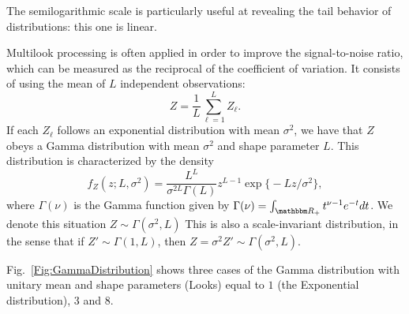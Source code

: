 \documentclass{beamer}
\begin{document}
\begin{frame}[allowframebreaks]

The semilogarithmic scale is particularly useful at revealing the tail behavior of distributions: this one is linear.

Multilook processing is often applied in order to improve the signal-to-noise ratio, which can be measured as the reciprocal of the coefficient of variation.
It consists of using the mean of $L$ independent observations:
\begin{equation}
Z = \frac1L \sum_{\ell=1}^{L} Z_\ell.
\end{equation}
If each $Z_\ell$ follows an exponential distribution with mean $\sigma^2$, we have that $Z$ obeys a Gamma distribution with mean $\sigma^2$ and shape parameter $L$.
This distribution is characterized by the density
\begin{equation}
f_Z(z;L,\sigma^2) = \frac{L^L}{\sigma^{2L}\Gamma(L)} z^{L-1} 
	\exp\big\{ -L z / \sigma^2
	\big\},
	\label{eq:SARGammaDensity}
\end{equation}
where $\Gamma(\nu)$ is the Gamma function given by $\Gamma(\nu)=\int_{\mathbbm R_+} t^{\nu-1} e^{-t} dt$.
We denote this situation $Z\sim\Gamma(\sigma^2,L)$
This is also a scale-invariant distribution, in the sense that if $Z'\sim\Gamma(1,L)$, then $Z=\sigma^2 Z'\sim \Gamma(\sigma^2,L)$.

Fig.~\ref{Fig:GammaDistribution} shows three cases of the Gamma distribution with unitary mean and shape parameters (Looks) equal to $1$ (the Exponential distribution), $3$ and $8$.



\end{frame}
\end{document}
